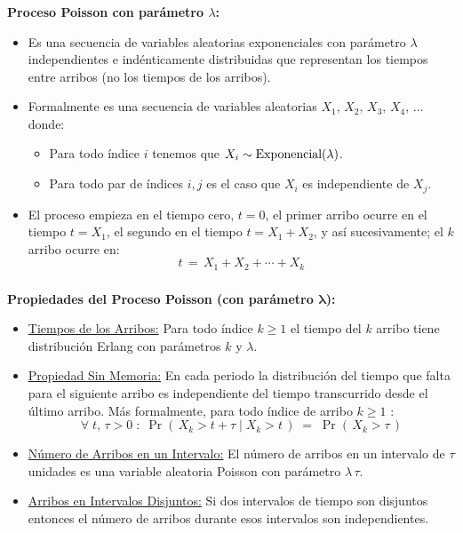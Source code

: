 \documentclass[ 10pt, xcolor = dvipsnames]{beamer}
\begin{document}
\begin{frame}[allowframebreaks]
\frametitle{\insertsection}

\textbf{Proceso Poisson con par\'ametro $\lambda$:}
\begin{itemize}
\item Es una secuencia de variables aleatorias exponenciales con par\'ametro $\lambda$ independientes e ind\'enticamente distribuidas que representan los tiempos entre arribos (no los tiempos de los arribos). 
\item Formalmente es una secuencia de variables aleatorias $X_1, \, X_2, \, X_3, \, X_4, \, \dots$ donde: 
\begin{itemize}
\item Para todo \'indice $i$ tenemos que $X_i \sim \text{Exponencial}(\lambda)$. 
\item Para todo par de \'indices $i,j$ es el caso que $X_i$ es independiente de $X_j$. 
\end{itemize}
\item El proceso empieza en el tiempo cero, \ie $t = 0$, el primer arribo ocurre en \linebreak el tiempo $t = X_1$, el segundo en el tiempo $t = X_1 + X_2$, y as\'i sucesivamente; \ie el $k$ arribo ocurre en: 
\[
t \, = \, X_1 + X_2 + \cdots + X_k
\]
\end{itemize}

\end{frame}

\begin{frame}[allowframebreaks]
\frametitle{\insertsection}

\textbf{Propiedades del Proceso Poisson (con par\'ametro $\boldsymbol{\lambda}$):}
\begin{itemize}
\item \underline{Tiempos de los Arribos:} Para todo \'indice $k \geq 1$ el tiempo del $k$ arribo tiene distribuci\'on Erlang con par\'ametros $k$ y $\lambda$. 
\item \underline{Propiedad Sin Memoria:} En cada periodo la distribuci\'on del tiempo que falta para el siguiente arribo es independiente del tiempo transcurrido desde el \'ultimo arribo. M\'as formalmente, para todo \'indice de arribo $k \geq 1$ : 
\[
\forall \; t, \, \tau > 0 \; \colon \;
\Pr( \, X_k > t + \tau \mid X_k > t \, ) \; = \;
\Pr( \, X_k > \tau \, )
\]
\item \underline{N\'umero de Arribos en un Intervalo:} El n\'umero de arribos en un intervalo de $\tau$ unidades es una variable aleatoria Poisson con par\'ametro $\lambda \, \tau$. 
\item \underline{Arribos en Intervalos Disjuntos:} Si dos intervalos de tiempo son disjuntos entonces el n\'umero de arribos durante esos intervalos son independientes. 
\end{itemize}

\end{frame}
\end{document}
